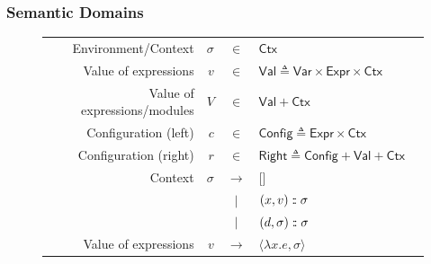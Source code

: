 \documentclass{beamer}
\theoremstyle{definition}
\newcommand*{\vbar}{|}
\newcommand*{\cons}{:{\hspace{-0.7em}}:}
\newcommand*{\Expr}{\mathsf{Expr}}
\newcommand*{\ExprVar}{\mathsf{Var}}
\newcommand*{\modid}{d}
\newcommand*{\ctx}{\sigma}
\newcommand*{\Ctx}{\mathsf{Ctx}}
\newcommand*{\Value}{\mathsf{Val}}
\newcommand*{\Config}{\mathsf{Config}}
\newcommand*{\config}{c}
\newcommand*{\Right}{\mathsf{Right}}
\newcommand*{\rightst}{r}
\begin{document}
\begin{frame}[c]
  \frametitle{Semantic Domains}
  \begin{figure}[h!]
    \footnotesize
    \centering
    \begin{tabular}{rrcll}
      Environment/Context          & $\ctx$     & $\in$         & $\Ctx$                                            \\
      Value of expressions         & $v$        & $\in$         & $\Value \triangleq \ExprVar\times\Expr\times\Ctx$ \\
      Value of expressions/modules & $V$        & $\in$         & $\Value+\Ctx$                                     \\
      Configuration (left)         & $\config$  & $\in$         & $\Config\triangleq\Expr\times\Ctx$                \\
      Configuration (right)        & $\rightst$ & $\in$         & $\Right\triangleq\Config+\Value+\Ctx$             \\
      Context                      & $\ctx$     & $\rightarrow$ & []                                                \\
                                   &            & $\vbar$       & $(x,v)\cons \ctx$                                 \\
                                   &            & $\vbar$       & $(\modid,\ctx)\cons \ctx$                         \\
      Value of expressions         & $v$        & $\rightarrow$ & $\langle \lambda x.e, \ctx \rangle$\end{tabular}
  \end{figure}
\end{frame}
\end{document}
